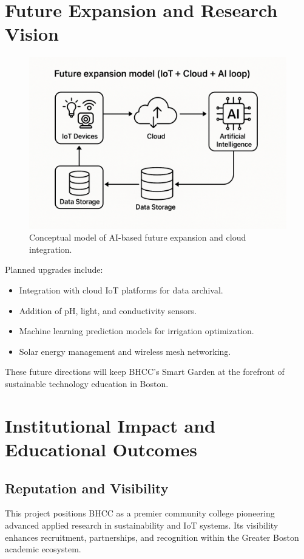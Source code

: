 \documentclass[12pt,a4paper]{article}
\begin{document}
\section{Future Expansion and Research Vision}

\begin{figure}[H]\centering
\includegraphics[width=0.9\linewidth]{figs/ai_future_expansion.png}
\caption{Conceptual model of AI-based future expansion and cloud integration.}
\end{figure}

Planned upgrades include:
\begin{itemize}
  \item Integration with cloud IoT platforms for data archival.
  \item Addition of pH, light, and conductivity sensors.
  \item Machine learning prediction models for irrigation optimization.
  \item Solar energy management and wireless mesh networking.
\end{itemize}

These future directions will keep BHCC’s Smart Garden at the forefront of sustainable technology education in Boston.

\clearpage
\section{Institutional Impact and Educational Outcomes}

\subsection{Reputation and Visibility}
This project positions BHCC as a premier community college pioneering advanced applied research in sustainability and IoT systems. Its visibility enhances recruitment, partnerships, and recognition within the Greater Boston academic ecosystem.
\end{document}
